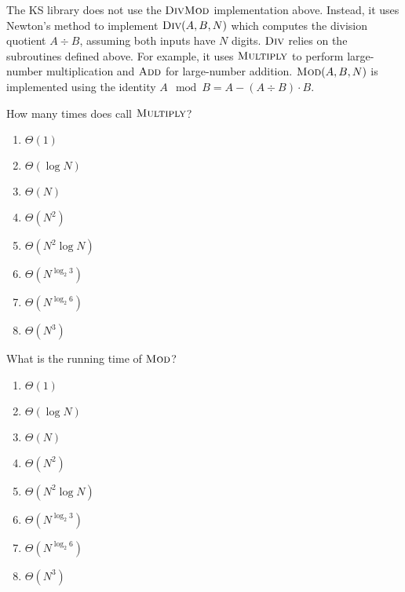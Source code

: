 \documentclass[12pt,twoside]{article}
\begin{document}
\begin{problems}
The KS library does not use the $\textnormal{\scshape DivMod}$ implementation above. Instead,
it uses Newton's method to implement $\textnormal{\scshape Div}(A, B, N)$ which computes the
division quotient $A \div B$, assuming both inputs have $N$ digits. $\textnormal{\scshape Div}$
relies on the subroutines defined above. For example, it uses $\textnormal{\scshape Multiply}$
to perform large-number multiplication and $\textnormal{\scshape Add}$ for large-number
addition. $\textnormal{\scshape Mod}(A, B, N)$ is implemented using the identity $A \mod B = A
- (A \div B) \cdot B$.

\begin{problemparts}

\problempart {} How many times does  call $\textnormal{\scshape Multiply}$?
\begin{enumerate}
  \item $\Theta(1)$
  \item $\Theta(\log N)$
  \item $\Theta(N)$
  \item $\Theta(N^2)$
  \item $\Theta(N^2 \log N)$
  \item $\Theta(N^{\log_2 3})$
  \item $\Theta(N^{\log_2 6})$
  \item $\Theta(N^3)$
\end{enumerate}

\problempart {} What is the running time of $\textnormal{\scshape Mod}$?
\begin{enumerate}
  \item $\Theta(1)$
  \item $\Theta(\log N)$
  \item $\Theta(N)$
  \item $\Theta(N^2)$
  \item $\Theta(N^2 \log N)$
  \item $\Theta(N^{\log_2 3})$
  \item $\Theta(N^{\log_2 6})$
  \item $\Theta(N^3)$
\end{enumerate}
\end{problemparts}


\end{problems}
\end{document}
